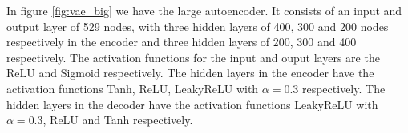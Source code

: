 In figure \ref{fig:vae_big} we have the large autoencoder. It consists of an input and output layer of 529 nodes, with three 
hidden layers of 400, 300 and 200 nodes respectively in the encoder and three hidden layers of 200, 300 and 400 respectively. 
The activation functions for the input and ouput layers are the ReLU and Sigmoid respectively. The hidden 
layers in the encoder have the activation functions Tanh, ReLU, LeakyReLU with $\alpha=0.3$ respectively. The hidden layers
in the decoder have the activation functions LeakyReLU with $\alpha=0.3$, ReLU and Tanh respectively.